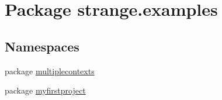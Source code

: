 \hypertarget{namespacestrange_1_1examples}{\section{Package strange.\-examples}
\label{namespacestrange_1_1examples}
}
\subsection*{Namespaces}
\begin{DoxyCompactItemize}
\item 
package \hyperlink{namespacestrange_1_1examples_1_1multiplecontexts}{multiplecontexts}
\item 
package \hyperlink{namespacestrange_1_1examples_1_1myfirstproject}{myfirstproject}
\end{DoxyCompactItemize}
